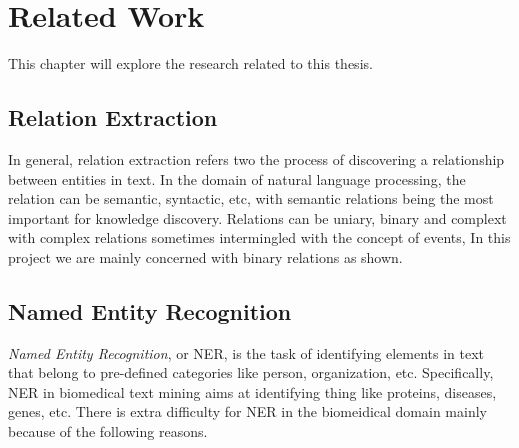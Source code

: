 \chapter{Related Work}  %

\ifpdf
    \graphicspath{{Background/Figs/Raster/}{Background/Figs/PDF/}{Background/Figs/}}
\else
    \graphicspath{{Background/Figs/Vector/}{Background/Figs/}}
\fi

This chapter will explore the research related to this thesis. 

\section{Relation Extraction} %
In general, relation extraction refers two the process of discovering a relationship between entities in text. In the domain of natural language processing, the relation can be semantic, syntactic, etc, with semantic relations being the most important for knowledge discovery. Relations can be uniary, binary and complext with complex relations sometimes intermingled with the concept of events, In this project we are mainly concerned with binary relations as shown.

\section{Named Entity Recognition}
\emph{Named Entity Recognition}, or NER, is the task of identifying elements in text that belong to pre-defined categories like person, organization, etc. Specifically, NER in biomedical text mining aims at identifying thing like proteins, diseases, genes, etc. There is extra difficulty for NER in the biomeidical domain mainly because of the following reasons. 

